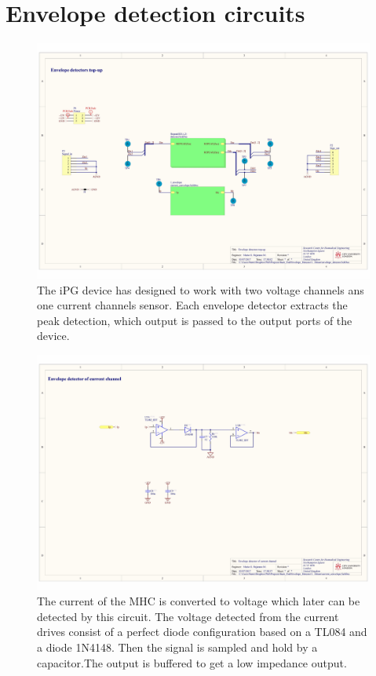 \section*{Envelope detection circuits}
\label{Appendix: Envelope}
\begin{figure}[!htpb]
	\centering
	\includegraphics[width=0.9\paperwidth,keepaspectratio,angle=90]{env_det_top}
	\caption[Top-up schematic of the envelope detector circuits]{The iPG device has designed to work with two voltage channels ans one current channels sensor. Each envelope detector extracts the peak detection, which output is passed to the output ports of the device.}
	\label{fig:envelope detector top}
\end{figure}

\begin{landscape}
	\begin{figure}[!htpb]
		\centering
		\includegraphics[width=0.95\paperwidth,keepaspectratio]{env_det_curr}
		\caption[Envelope detector of the current channel]{The current of the MHC is converted to voltage which later can be detected by this circuit. The voltage detected from the current drives consist of a perfect diode configuration based on a TL084 and a diode 1N4148. Then the signal is sampled and hold by a capacitor.The output is buffered to get a low impedance output.}
		\label{fig:envelope detector current}
	\end{figure}
\end{landscape}

